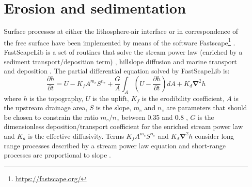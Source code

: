 \documentclass[hidelinks,10pt,a4paper]{article}
\begin{document}
\section{Erosion and sedimentation}\label{sec:erosion}
Surface processes at either the lithosphere-air interface or in correspondence of the free surface have been implemented by means of the software
Fastscape\footnote{\url{https://fastscape.org/}} \citep{Braun2013,Cordonnier2019,Yuan2019a,Yuan2019b}. FastScapeLib is a set of routines that solve the stream
power law (enriched by a sediment transport/deposition term) \citep{Yuan2019a}, hillslope diffusion and marine transport and deposition \citep{Yuan2019b}.
The partial differential equation solved by FastScapeLib is:
\begin{equation}
\frac{\partial h}{ \partial t}=U-K_f A^{m_e}S^{n_e} + \frac{G}{A}\int_A \left( U-\frac{\partial h}{\partial t} \right) dA + K_d \bm{\nabla}^2 h 
\end{equation}
where $h$ is the topography, $U$ is the uplift, $K_f$ is the erodibility coefficient, $A$ is the upstream drainage area, $S$ is the slope, $m_e$ and $n_e$ are
parameters that should be chosen to constrain the ratio $m_e/n_e$ between 0.35 and 0.8 \citep{Croissant2014,Ueda2015,Beucher2020}, $G$ is the dimensionless
deposition/transport coefficient for the enriched stream power law and $K_d$ is the effective diffusivity. Terms $K_f A^{m_e}S^{n_e}$ and $K_d \bm{\nabla}^2 h$
consider long-range processes described by a stream power law equation \citep{Tucker1999,Ueda2015,Beucher2020} and short-range processes are
proportional to slope \citep{Burov1997,Ueda2015,Beucher2020}.
\end{document}
